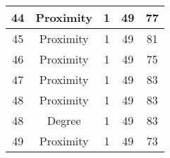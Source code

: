 \documentclass[results.tex]{subfiles}
\begin{document}
\begin{center}
\begin{tabular}{| c || c | c | c | c |}
    \hline
    44 & Proximity & 1 & 49 & 77 \\ 
    \hline
    45 & Proximity & 1 & 49 & 81 \\ 
    \hline
    46 & Proximity & 1 & 49 & 75 \\ 
    \hline
    47 & Proximity & 1 & 49 & 83 \\ 
    \hline
    48 & Proximity & 1 & 49 & 83 \\ 
    \hline
    48 & Degree & 1 & 49 & 83 \\ 
    \hline
    49 & Proximity & 1 & 49 & 73 \\ 
    \hline   \end{tabular}
\end{center}
\end{document}
